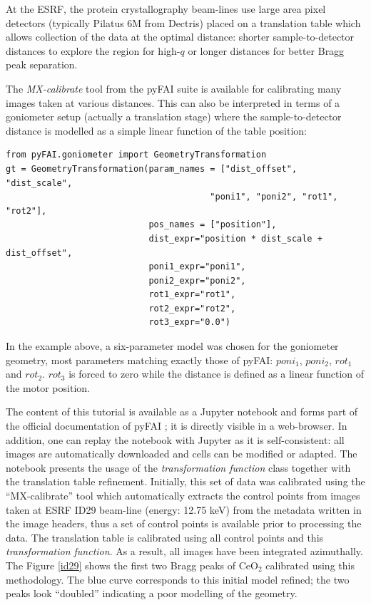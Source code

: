 \documentclass[preprint]{iucr}              %
\begin{document}
At the  ESRF, the protein crystallography beam-lines use large area pixel detectors
(typically Pilatus 6M from Dectris) placed on a translation table which allows
collection of the data at the optimal distance: shorter sample-to-detector
distances to explore the region for high-$q$ 
or longer distances for better Bragg peak separation. 

The \textit{MX-calibrate} tool from the pyFAI suite is available for
calibrating many images taken at various distances.
This can also be interpreted in terms of a goniometer setup (actually a translation stage) 
where the sample-to-detector distance is modelled as a
simple linear function of the table position:

\begin{verbatim}
from pyFAI.goniometer import GeometryTransformation
gt = GeometryTransformation(param_names = ["dist_offset", "dist_scale", 
                                        "poni1", "poni2", "rot1", "rot2"],
                            pos_names = ["position"],
                            dist_expr="position * dist_scale + dist_offset", 
                            poni1_expr="poni1",
                            poni2_expr="poni2", 
                            rot1_expr="rot1", 
                            rot2_expr="rot2", 
                            rot3_expr="0.0")
\end{verbatim}
 
In the example above, a six-parameter model was chosen for the goniometer
geometry, most parameters matching exactly those of pyFAI: 
$poni_1$, $poni_2$, $rot_1$
and $rot_2$. 
$rot_3$ is forced to zero while the distance is defined as a 
linear function of the motor position. 

The content of this tutorial is available as a Jupyter
notebook \cite{ipython} and forms part of the official documentation of pyFAI
\cite{translation_table}; it is directly visible in a web-browser. 
In addition, one can replay the notebook with Jupyter as it is self-consistent: 
all images are automatically downloaded and cells can be
modified or adapted.
The notebook presents the usage of the \textit{transformation function} class
together with the translation table refinement.
Initially, this set of data was calibrated using the ``MX-calibrate'' tool
which automatically extracts the control points from images taken at
ESRF ID29 beam-line (energy: 12.75 keV) from
the metadata written in the image headers, thus a set of control points is
available prior to processing the data. 
The translation table is calibrated using all control points
and this \textit{transformation function}.
As a result, all images have been integrated azimuthally.
The Figure \ref{id29} shows the first two Bragg peaks of CeO$_2$ calibrated
using this methodology. 
The blue curve corresponds to this initial model refined; the two peaks look
``doubled'' indicating a poor modelling of the geometry.
\end{document}
